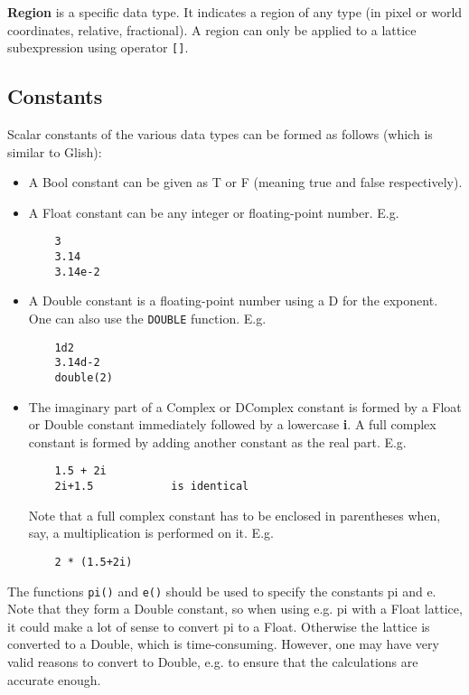 \textbf{Region} is a specific data type. It indicates a region of any type
(in pixel or world coordinates, relative, fractional).
A region can only be applied to a lattice subexpression using
operator \texttt{[]}.


\subsection{\label{LEL:CONSTANTS}Constants}
Scalar constants of the various data types can be formed as follows
(which is similar to Glish):
\begin{itemize}
  \item A Bool constant can be given as T or F
        (meaning true and false respectively).
  \item A Float constant can be any integer or floating-point number. E.g.
    \begin{verbatim}
    3
    3.14
    3.14e-2
    \end{verbatim}
  \item A Double constant is a floating-point number using a D for the
    exponent. One can also use the \texttt{DOUBLE} function. E.g.
    \begin{verbatim}
    1d2
    3.14d-2
    double(2)
    \end{verbatim}
  \item The imaginary part of a Complex or DComplex constant is formed
    by a Float or Double constant immediately followed by a lowercase
    \textbf{i}. A full complex
    constant is formed by adding another constant as the
    real part. E.g.
    \begin{verbatim}
    1.5 + 2i
    2i+1.5            is identical
    \end{verbatim}
    Note that a full complex constant has to be enclosed
    in parentheses when, say, a multiplication is performed on it. E.g.
    \begin{verbatim}
    2 * (1.5+2i)
    \end{verbatim}
\end{itemize}
The functions \texttt{pi()} and \texttt{e()} should be
used to specify the constants pi and e. Note that they form a Double constant,
so when using e.g. pi with a Float lattice, it could make a lot of sense
to convert pi to a Float. Otherwise the lattice is converted to a
Double, which is time-consuming. However, one may have very valid
reasons to convert to Double, e.g. to ensure that the calculations are
accurate enough.

